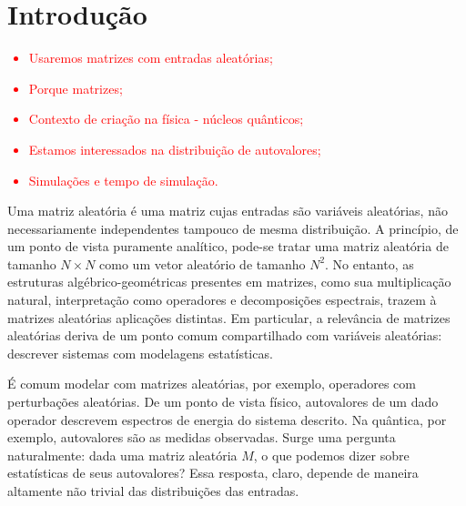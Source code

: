 \chapter{Introdução}

\textcolor{red}{
\begin{itemize}
	\item Usaremos matrizes com entradas aleatórias;
	\item Porque matrizes;
	\item Contexto de criação na física - núcleos quânticos;
	\item Estamos interessados na distribuição de autovalores;
	\item Simulações e tempo de simulação.
\end{itemize}
}

Uma matriz aleatória é uma matriz cujas entradas são variáveis aleatórias, não necessariamente independentes tampouco de mesma distribuição. A princípio, de um ponto de vista puramente analítico, pode-se tratar uma matriz aleatória de tamanho $N\times N$ como um vetor aleatório de tamanho $N^2$. No entanto, as estruturas algébrico-geométricas presentes em matrizes, como sua multiplicação natural, interpretação como operadores e decomposições espectrais, trazem à matrizes aleatórias aplicações distintas. Em particular, a relevância de matrizes aleatórias deriva de um ponto comum compartilhado com variáveis aleatórias: descrever sistemas com modelagens estatísticas. 
	
É comum modelar com matrizes aleatórias, por exemplo, operadores com perturbações aleatórias. De um ponto de vista físico, autovalores de um dado operador descrevem espectros de energia do sistema descrito. Na quântica, por exemplo, autovalores são as medidas observadas. Surge uma pergunta naturalmente: dada uma matriz aleatória $M$, o que podemos dizer sobre estatísticas de seus autovalores? Essa resposta, claro, depende de maneira altamente não trivial das distribuições das entradas.  
